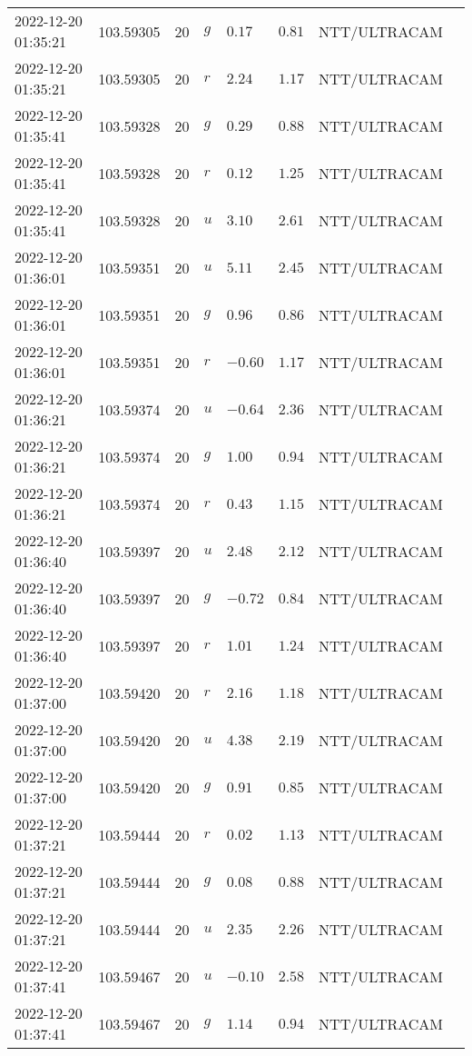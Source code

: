 \documentclass{nature_plusfigure}
\begin{document}
\begin{supplement}
\begin{center}
\begin{longtable}{llllllll}
2022-12-20 01:35:21 & 103.59305 & 20 & $g$ & $0.17$ & $0.81$ & NTT/ULTRACAM &  \\ 
2022-12-20 01:35:21 & 103.59305 & 20 & $r$ & $2.24$ & $1.17$ & NTT/ULTRACAM &  \\ 
2022-12-20 01:35:41 & 103.59328 & 20 & $g$ & $0.29$ & $0.88$ & NTT/ULTRACAM &  \\ 
2022-12-20 01:35:41 & 103.59328 & 20 & $r$ & $0.12$ & $1.25$ & NTT/ULTRACAM &  \\ 
2022-12-20 01:35:41 & 103.59328 & 20 & $u$ & $3.10$ & $2.61$ & NTT/ULTRACAM &  \\ 
2022-12-20 01:36:01 & 103.59351 & 20 & $u$ & $5.11$ & $2.45$ & NTT/ULTRACAM &  \\ 
2022-12-20 01:36:01 & 103.59351 & 20 & $g$ & $0.96$ & $0.86$ & NTT/ULTRACAM &  \\ 
2022-12-20 01:36:01 & 103.59351 & 20 & $r$ & $-0.60$ & $1.17$ & NTT/ULTRACAM &  \\ 
2022-12-20 01:36:21 & 103.59374 & 20 & $u$ & $-0.64$ & $2.36$ & NTT/ULTRACAM &  \\ 
2022-12-20 01:36:21 & 103.59374 & 20 & $g$ & $1.00$ & $0.94$ & NTT/ULTRACAM &  \\ 
2022-12-20 01:36:21 & 103.59374 & 20 & $r$ & $0.43$ & $1.15$ & NTT/ULTRACAM &  \\ 
2022-12-20 01:36:40 & 103.59397 & 20 & $u$ & $2.48$ & $2.12$ & NTT/ULTRACAM &  \\ 
2022-12-20 01:36:40 & 103.59397 & 20 & $g$ & $-0.72$ & $0.84$ & NTT/ULTRACAM &  \\ 
2022-12-20 01:36:40 & 103.59397 & 20 & $r$ & $1.01$ & $1.24$ & NTT/ULTRACAM &  \\ 
2022-12-20 01:37:00 & 103.59420 & 20 & $r$ & $2.16$ & $1.18$ & NTT/ULTRACAM &  \\ 
2022-12-20 01:37:00 & 103.59420 & 20 & $u$ & $4.38$ & $2.19$ & NTT/ULTRACAM &  \\ 
2022-12-20 01:37:00 & 103.59420 & 20 & $g$ & $0.91$ & $0.85$ & NTT/ULTRACAM &  \\ 
2022-12-20 01:37:21 & 103.59444 & 20 & $r$ & $0.02$ & $1.13$ & NTT/ULTRACAM &  \\ 
2022-12-20 01:37:21 & 103.59444 & 20 & $g$ & $0.08$ & $0.88$ & NTT/ULTRACAM &  \\ 
2022-12-20 01:37:21 & 103.59444 & 20 & $u$ & $2.35$ & $2.26$ & NTT/ULTRACAM &  \\ 
2022-12-20 01:37:41 & 103.59467 & 20 & $u$ & $-0.10$ & $2.58$ & NTT/ULTRACAM &  \\ 
2022-12-20 01:37:41 & 103.59467 & 20 & $g$ & $1.14$ & $0.94$ & NTT/ULTRACAM &  \\ 

\end{longtable}
\end{center}
\end{supplement}
\end{document}
